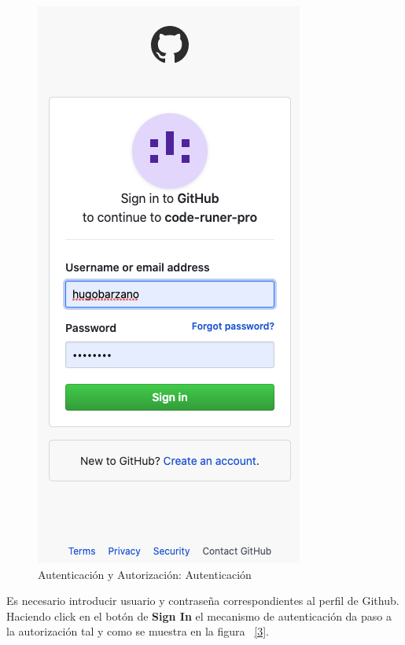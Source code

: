 \documentclass[a4paper,11pt]{book}
\begin{document}
\begin{figure}[H]
\centering
\includegraphics[scale=0.45]{imagenes/casouso_a/2.png}
\caption{  Autenticación y Autorización: Autenticación }
\label{2}
\end{figure}

Es necesario introducir usuario y contraseña correspondientes al perfil de Github. Haciendo click en el botón de  \textbf{Sign In} el mecanismo de autenticación da paso a  la autorización tal y como se muestra en la figura  ~\ref{3}.  
\end{document}
